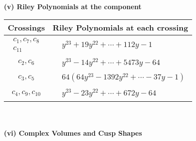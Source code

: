 \documentclass[1p]{elsarticle_modified}
\theoremstyle{definition}
\begin{document}
\newpage\renewcommand{\arraystretch}{1}
\flushleft \textbf{(v) Riley Polynomials at the component}\newline \\
\begin{tabular}{m{50pt}|m{274pt}}
Crossings & \hspace{64pt}Riley Polynomials at each crossing \\
\hline $$\begin{aligned}c_{1},c_{7},c_{8}\\c_{11}\end{aligned}$$&$\begin{aligned}
&y^{23}+19 y^{22}+\cdots+112 y-1
\end{aligned}$\\
\hline $$\begin{aligned}c_{2},c_{6}\end{aligned}$$&$\begin{aligned}
&y^{23}-14 y^{22}+\cdots+5473 y-64
\end{aligned}$\\
\hline $$\begin{aligned}c_{3},c_{5}\end{aligned}$$&$\begin{aligned}
&64(64 y^{23}-1392 y^{22}+\cdots-37 y-1)
\end{aligned}$\\
\hline $$\begin{aligned}c_{4},c_{9},c_{10}\end{aligned}$$&$\begin{aligned}
&y^{23}-23 y^{22}+\cdots+672 y-64
\end{aligned}$\\
\hline
\end{tabular}\\~\\
\newpage\flushleft \textbf{(vi) Complex Volumes and Cusp Shapes}
\end{document}
